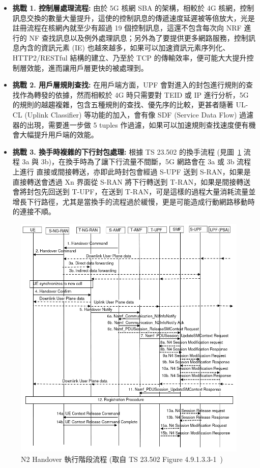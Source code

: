\begin{itemize}
\item \textbf{挑戰 1. 控制層處理流程:} 由於 5G 核網 SBA 的架構，相較於 4G 核網，控制訊息交換的數量大量提升，這使的控制訊息的傳遞速度延遲被等倍放大，光是註冊流程在核網內就至少有超過 19 個控制訊息，這還不包含每次向 NRF 進行的 NF 查找訊息以及例外處理訊息；另外為了要提供更多網路服務，控制訊息內含的資訊元素 (IE) 也越來越多，如果可以加速資訊元素序列化、HTTP2/RESTful 結構的建立、乃至於 TCP 的傳輸效率，便可能大大提升控制層效能，進而讓用戶層更快的被處理到。
\item \textbf{挑戰 2. 用戶層規則查找:} 在用戶端方面，UPF 會對進入的封包進行規則的查找作為轉發的依據，然而相較於 4G 時只需要對 TEID 或 IP 進行分析，5G 的規則的越趨複雜，包含五種規則的查找、優先序的比較，更甚者隨著 UL-CL (Uplink Classifier) 等功能的加入，會有像 SDF (Service Data Flow) 過濾器的出現，需要進一步做 5 tuples 作過濾，如果可以加速規則查找速度便有機會大幅提升用戶端的效能。
\item \textbf{挑戰 3. 換手時複雜的下行封包處理:} 根據 TS 23.502 的換手流程 (見圖~\ref{fig:n2_hand_exec_proc} 流程 3a 與 3b)，在換手時為了讓下行流量不間斷，5G 網路會在 3a 或 3b 流程上進行 直接或間接轉送，亦即此時封包會經過 S-UPF 送到 S-RAN，如果是直接轉送會透過 Xn 界面從 S-RAN 將下行轉送到 T-RAN，如果是間接轉送會將封包先回送到 T-UPF，在送到 T-RAN，可是這樣的過程大量消耗流量並增長下行路徑，尤其是當換手的流程過於緩慢，更是可能造成行動網路移動時的連接不順。
\end{itemize}

\begin{figure}[htbp]
    \centering
    \includegraphics[height=!,width=0.9\linewidth,keepaspectratio=true]{figures/23_502_4_9_1_3_3-1_N2_handover_exec.png}
    \caption[N2 Handover 執行階段流程]{{\footnotesize N2 Handover 執行階段流程 (取自 TS 23.502 Figure 4.9.1.3.3-1~\cite{3gpp.23.502})}}
    \label{fig:n2_hand_exec_proc}
\end{figure}


